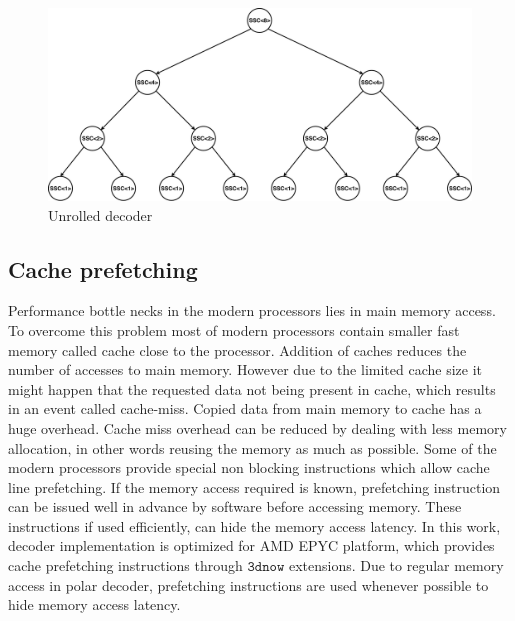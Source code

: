 \begin{figure}[]
	\centering
	\includegraphics[width=1\textwidth]{./figures/unrolledDecoder.pdf}
	\caption{Unrolled decoder}
	\label{fig:unrolledDecoder}
\end{figure}

\subsection{Cache prefetching}
Performance bottle necks in the modern processors lies in main memory access. To overcome this problem most of modern processors contain smaller fast memory called cache close to the processor. Addition of caches reduces the number of accesses to main memory. However due to the limited cache size it might happen that the requested data not being present in cache, which results in an event called cache-miss. Copied data from main memory to cache has a huge overhead. Cache miss overhead can be reduced by dealing with less memory allocation, in other words reusing the memory as much as possible. Some of the modern processors provide special non blocking instructions which allow cache line prefetching. If the memory access required is known, prefetching instruction can be issued well in advance by software before accessing memory. These instructions if used efficiently, can hide the memory access latency. In this work, decoder implementation is optimized for AMD EPYC platform, which provides cache prefetching instructions through $ \mathtt{3dnow} $ extensions. Due to regular memory access in polar decoder, prefetching instructions are used whenever possible to hide memory access latency.

